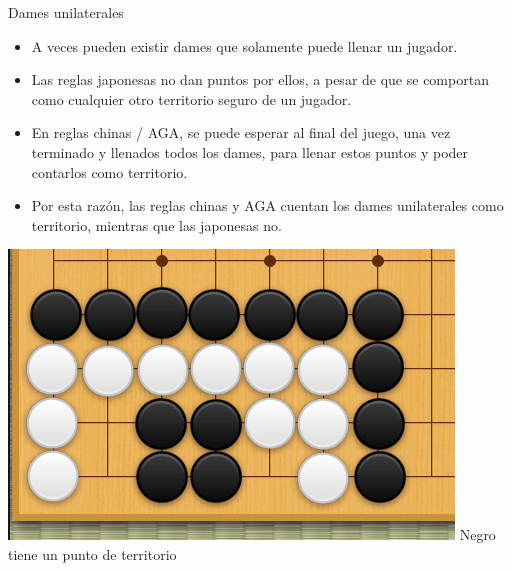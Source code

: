 \documentclass{beamer}
\begin{document}
\begin{frame}{Dames unilaterales}

    \begin{itemize}
        \item A veces pueden existir dames que solamente puede llenar un jugador.
        \item Las reglas japonesas no dan puntos por ellos, a pesar de que se comportan como cualquier otro territorio seguro de un jugador.
        \item En reglas chinas / AGA, se puede esperar al final del juego, una vez terminado y llenados todos los dames, para llenar estos puntos y poder contarlos como territorio.
        \item Por esta razón, las reglas chinas y AGA cuentan los dames unilaterales como territorio, mientras que las japonesas no.
    \end{itemize}
  
    \includegraphics[scale=0.3]{unilateral.png} Negro tiene un punto de territorio
  
\end{frame}
\end{document}
